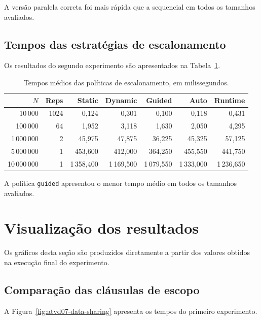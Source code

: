 A versão paralela correta foi mais rápida que a sequencial em todos os
tamanhos avaliados.


\subsection{Tempos das estratégias de escalonamento}

Os resultados do segundo experimento são apresentados na
Tabela~\ref{tab:atvd07-tempos-schedule}.

\begin{table}[htbp]
\centering
\caption{Tempos médios das políticas de escalonamento, em milissegundos.}
\label{tab:atvd07-tempos-schedule}
\small
\begin{tabular}{|r|r|r|r|r|r|r|}
\hline
\textbf{\(N\)} &
\textbf{Reps} &
\textbf{Static} &
\textbf{Dynamic} &
\textbf{Guided} &
\textbf{Auto} &
\textbf{Runtime} \\
\hline
10\,000
& 1024 & 0,124 & 0,301 & 0,100 & 0,118 & 0,431 \\
\hline
100\,000
& 64 & 1,952 & 3,118 & 1,630 & 2,050 & 4,295 \\
\hline
1\,000\,000
& 2 & 45,975 & 47,875 & 36,225 & 45,325 & 57,125 \\
\hline
5\,000\,000
& 1 & 453,600 & 412,000 & 364,250 & 455,550 & 441,750 \\
\hline
10\,000\,000
& 1 & 1\,358,400 & 1\,169,500 & 1\,079,550 &
1\,333,000 & 1\,236,650 \\
\hline
\end{tabular}
\end{table}

A política \texttt{guided} apresentou o menor tempo médio em todos os
tamanhos avaliados.


\section{Visualização dos resultados}
\label{sec:atvd07-visualizacao}

Os gráficos desta seção são produzidos diretamente a partir dos valores
obtidos na execução final do experimento.

\subsection{Comparação das cláusulas de escopo}

A Figura~\ref{fig:atvd07-data-sharing} apresenta os tempos do primeiro
experimento.

